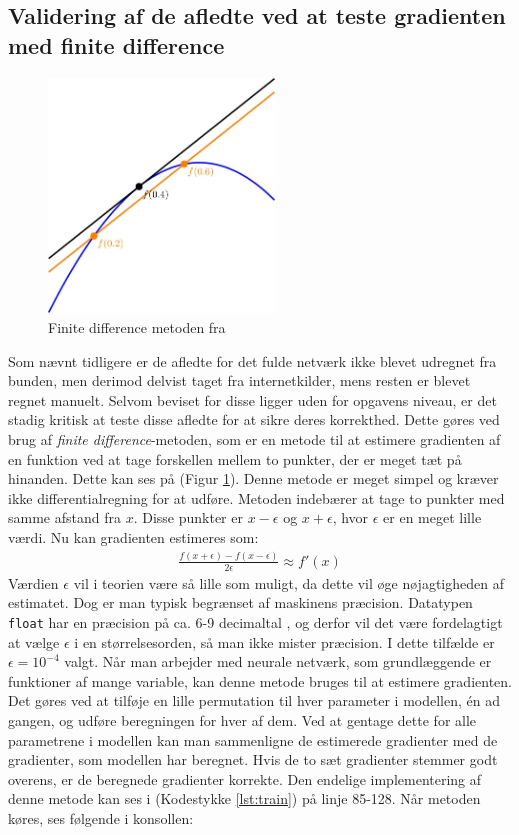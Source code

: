\documentclass{article}
\newcommand{\figureref}[1]{(Figur \ref{#1})}
\newcommand{\listingref}[1]{(Kodestykke \ref{#1})}
\begin{document}
\subsection{Validering af de afledte ved at teste gradienten med finite difference}
\begin{figure}
  \vspace{-0.5cm}
  \includegraphics[width=6cm]{fd.jpg}
  \vspace{-0.8cm}
  \caption{Finite difference metoden fra \parencite{pranckevicius2015finite}}
  \label{fig:fd}
\end{figure}
Som nævnt tidligere er de afledte for det fulde netværk ikke blevet udregnet fra bunden, men derimod delvist taget fra internetkilder, mens resten er blevet regnet manuelt. Selvom beviset for disse ligger uden for opgavens niveau, er det stadig kritisk at teste disse afledte for at sikre deres korrekthed. Dette gøres ved brug af \textit{finite difference}-metoden, som er en metode til at estimere gradienten af en funktion ved at tage forskellen mellem to punkter, der er meget tæt på hinanden. Dette kan ses på \figureref{fig:fd}. Denne metode er meget simpel og kræver ikke differentialregning for at udføre. Metoden indebærer at tage to punkter med samme afstand fra $x$. Disse punkter er $x-\epsilon$ og $x+\epsilon$, hvor $\epsilon$ er en meget lille værdi. Nu kan gradienten estimeres som:
\begin{align}
  \frac{f(x+\epsilon)-f(x-\epsilon)}{2\epsilon}\approx f'(x)
\end{align}
Værdien $\epsilon$ vil i teorien være så lille som muligt, da dette vil øge nøjagtigheden af estimatet. Dog er man typisk begrænset af maskinens præcision. Datatypen \texttt{float} har en præcision på ca. 6-9 decimaltal \parencite{wagner2022floating}, og derfor vil det være fordelagtigt at vælge $\epsilon$ i en størrelsesorden, så man ikke mister præcision. I dette tilfælde er $\epsilon=10^{-4}$ valgt. Når man arbejder med neurale netværk, som grundlæggende er funktioner af mange variable, kan denne metode bruges til at estimere gradienten. Det gøres ved at tilføje en lille permutation til hver parameter i modellen, én ad gangen, og udføre beregningen for hver af dem. Ved at gentage dette for alle parametrene i modellen kan man sammenligne de estimerede gradienter med de gradienter, som modellen har beregnet. Hvis de to sæt gradienter stemmer godt overens, er de beregnede gradienter korrekte. Den endelige implementering af denne metode kan ses i \listingref{lst:train} på linje 85-128. Når metoden køres, ses følgende i konsollen:
\end{document}
